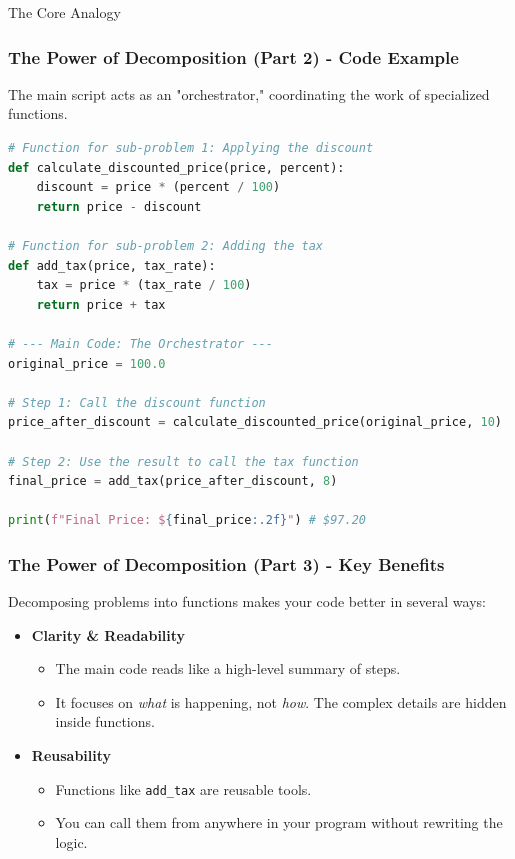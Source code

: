 \documentclass{beamer}
\begin{document}
\begin{frame}[fragile]
\begin{block}{The Core Analogy}
\begin{frame}
\end{frame}

\begin{frame}[fragile]
    \frametitle{The Power of Decomposition (Part 2) - Code Example}
    
    The main script acts as an "orchestrator," coordinating the work of specialized functions.
    
    \begin{lstlisting}[language=Python]
# Function for sub-problem 1: Applying the discount
def calculate_discounted_price(price, percent):
    discount = price * (percent / 100)
    return price - discount

# Function for sub-problem 2: Adding the tax
def add_tax(price, tax_rate):
    tax = price * (tax_rate / 100)
    return price + tax

# --- Main Code: The Orchestrator ---
original_price = 100.0

# Step 1: Call the discount function
price_after_discount = calculate_discounted_price(original_price, 10)

# Step 2: Use the result to call the tax function
final_price = add_tax(price_after_discount, 8)

print(f"Final Price: ${final_price:.2f}") # $97.20
    \end{lstlisting}
\end{frame}

\begin{frame}
    \frametitle{The Power of Decomposition (Part 3) - Key Benefits}
    
    Decomposing problems into functions makes your code better in several ways:
    
    \begin{itemize}
        \item \textbf{Clarity \& Readability}
        \begin{itemize}
            \item The main code reads like a high-level summary of steps.
            \item It focuses on \textit{what} is happening, not \textit{how}. The complex details are hidden inside functions.
        \end{itemize}
        
        \vspace{0.5cm}
        
        \item \textbf{Reusability}
        \begin{itemize}
            \item Functions like \texttt{add\_tax} are reusable tools.
            \item You can call them from anywhere in your program without rewriting the logic.
        \end{itemize}
        

\end{itemize}
\end{frame}
\end{block}
\end{frame}
\end{document}
